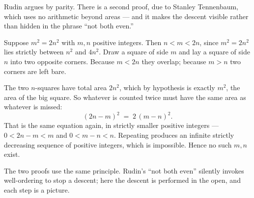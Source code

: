 \begin{deeper}
Rudin argues by parity. There is a second proof, due to Stanley Tennenbaum,
which uses no arithmetic beyond areas --- and it makes the descent visible
rather than hidden in the phrase ``not both even.''

\medskip
Suppose $m^2 = 2n^2$ with $m,n$ positive integers. Then $n<m<2n$, since
$m^2=2n^2$ lies strictly between $n^2$ and $4n^2$. Draw a square of side $m$
and lay a square of side $n$ into two opposite corners. Because $m<2n$ they
overlap; because $m>n$ two corners are left bare.

\medskip
\begin{center}
\end{center}

\smallskip
The two $n$-squares have total area $2n^2$, which by hypothesis is exactly
$m^2$, the area of the big square. So whatever is counted twice must have the
same area as whatever is missed:
\[ (2n-m)^2 \;=\; 2\,(m-n)^2 . \]
That is the same equation again, in strictly smaller positive integers ---
$0<2n-m<m$ and $0<m-n<n$. Repeating produces an infinite strictly decreasing
sequence of positive integers, which is impossible. Hence no such $m,n$ exist.

\smallskip
The two proofs use the same principle. Rudin's ``not both even'' silently
invokes well-ordering to stop a descent; here the descent is performed in the
open, and each step is a picture.
\end{deeper}

